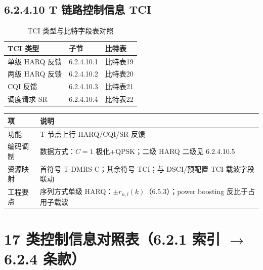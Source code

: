 \documentclass[11pt,a4paper]{ctexart}
\begin{document}
\subsection{6.2.4.10 T 链路控制信息 TCI}

\begin{table}[h]
\centering
\small
\caption{TCI 类型与比特字段表对照}
\begin{tabular}{L{3.5cm}L{2.5cm}L{4cm}}
\toprule
\textbf{TCI 类型} & \textbf{子节} & \textbf{比特表} \\
\midrule
单级 HARQ 反馈 & 6.2.4.10.1 & 比特表19 \\
两级 HARQ 反馈 & 6.2.4.10.2 & 比特表20 \\
CQI 反馈 & 6.2.4.10.3 & 比特表21 \\
调度请求 SR & 6.2.4.10.4 & 比特表22 \\
\bottomrule
\end{tabular}
\end{table}

\begin{table}[h]
\centering
\small
\begin{tabular}{L{2.2cm}L{10.8cm}}
\toprule
\textbf{项} & \textbf{说明} \\
\midrule
功能 & T 节点上行 HARQ/CQI/SR 反馈 \\
编码调制 & 数据方式：$C{=}1$ 极化+QPSK；二级 HARQ 二级见 6.2.4.10.5 \\
资源映射 & 首符号 T-DMRS-C；其余符号 TCI；与 DSCI/预配置 TCI 载波字段联动 \\
工程要点 & 序列方式单级 HARQ：$\pm r_{n,l}(k)$（6.5.3）；power boosting 反比于占用子载波 \\
\bottomrule
\end{tabular}
\end{table}

\section{17 类控制信息对照表（6.2.1 索引 $\rightarrow$ 6.2.4 条款）}
\end{document}
